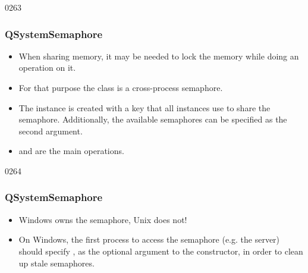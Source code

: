 \begin{slide}{0263}
\frametitle{QSystemSemaphore}
\begin{itemize}
\item When sharing memory, it may be needed to lock the memory while doing
  an operation on it.
\item For that purpose the class  is a cross-process
  semaphore.
\item The  instance is created with a key that all
  instances use to share the semaphore. Additionally, the available
  semaphores can be specified as the second argument.
\item {} and
   are the main operations.
\end{itemize}
\end{slide}


\begin{slide}{0264}
\frametitle{QSystemSemaphore}
\begin{itemize}
\item Windows owns the semaphore, Unix does not!
\item On Windows, the first process to access the semaphore (e.g. the server) should
  specify , as the optional argument to
  the constructor, in order to clean up stale semaphores.
\end{itemize}
\end{slide}
